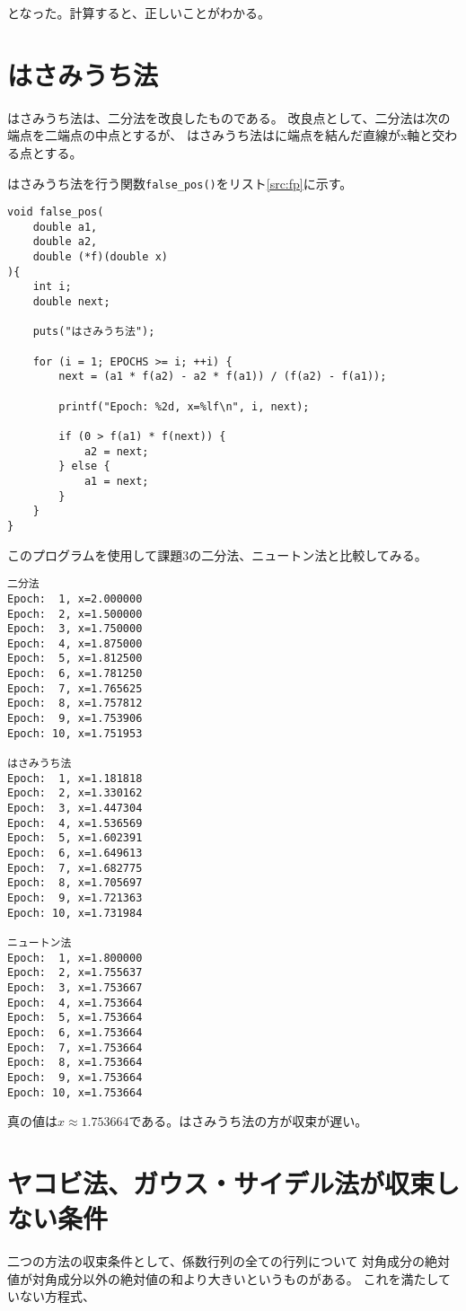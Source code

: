 \documentclass{jsarticle}
\begin{document}
            となった。計算すると、正しいことがわかる。

    \section{はさみうち法}
        はさみうち法は、二分法を改良したものである。
        改良点として、二分法は次の端点を二端点の中点とするが、
        はさみうち法はに端点を結んだ直線がx軸と交わる点とする。

        はさみうち法を行う関数\verb|false_pos()|をリスト\ref{src:fp}に示す。

        \begin{lstlisting}[caption=false\_pos, label=src:fp]
void false_pos(
    double a1,
    double a2,
    double (*f)(double x)
){
    int i;
    double next;

    puts("はさみうち法");

    for (i = 1; EPOCHS >= i; ++i) {
        next = (a1 * f(a2) - a2 * f(a1)) / (f(a2) - f(a1));

        printf("Epoch: %2d, x=%lf\n", i, next);

        if (0 > f(a1) * f(next)) {
            a2 = next;
        } else {
            a1 = next;
        }
    }
}
        \end{lstlisting}

        このプログラムを使用して課題3の二分法、ニュートン法と比較してみる。

        \begin{verbatim}
二分法
Epoch:  1, x=2.000000
Epoch:  2, x=1.500000
Epoch:  3, x=1.750000
Epoch:  4, x=1.875000
Epoch:  5, x=1.812500
Epoch:  6, x=1.781250
Epoch:  7, x=1.765625
Epoch:  8, x=1.757812
Epoch:  9, x=1.753906
Epoch: 10, x=1.751953

はさみうち法
Epoch:  1, x=1.181818
Epoch:  2, x=1.330162
Epoch:  3, x=1.447304
Epoch:  4, x=1.536569
Epoch:  5, x=1.602391
Epoch:  6, x=1.649613
Epoch:  7, x=1.682775
Epoch:  8, x=1.705697
Epoch:  9, x=1.721363
Epoch: 10, x=1.731984

ニュートン法
Epoch:  1, x=1.800000
Epoch:  2, x=1.755637
Epoch:  3, x=1.753667
Epoch:  4, x=1.753664
Epoch:  5, x=1.753664
Epoch:  6, x=1.753664
Epoch:  7, x=1.753664
Epoch:  8, x=1.753664
Epoch:  9, x=1.753664
Epoch: 10, x=1.753664
        \end{verbatim}

        真の値は$x \approx 1.753664$である。はさみうち法の方が収束が遅い。
        
    \section{ヤコビ法、ガウス・サイデル法が収束しない条件}
        二つの方法の収束条件として、係数行列の全ての行列について
        対角成分の絶対値が対角成分以外の絶対値の和より大きいというものがある。
        これを満たしていない方程式、
\end{document}
